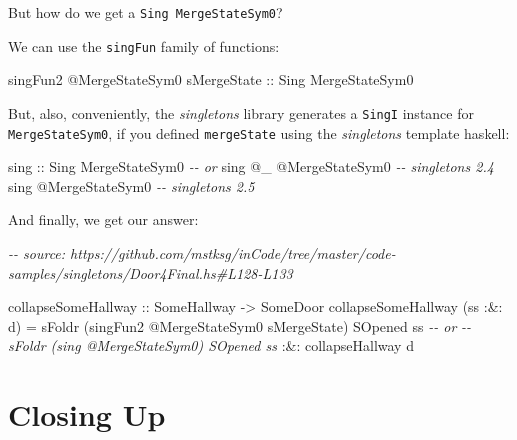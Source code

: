 \documentclass[]{article}
\newenvironment{Shaded}{}{}
\newcommand{\CommentTok}[1]{\textcolor[rgb]{0.38,0.63,0.69}{\textit{#1}}}
\newcommand{\DataTypeTok}[1]{\textcolor[rgb]{0.56,0.13,0.00}{#1}}
\newcommand{\NormalTok}[1]{#1}
\newcommand{\OperatorTok}[1]{\textcolor[rgb]{0.40,0.40,0.40}{#1}}
\newcommand{\OtherTok}[1]{\textcolor[rgb]{0.00,0.44,0.13}{#1}}
\begin{document}
But how do we get a \texttt{Sing\ MergeStateSym0}?

We can use the \texttt{singFun} family of functions:

\begin{Shaded}
\begin{Highlighting}[]
\NormalTok{singFun2 }\OperatorTok{@}\DataTypeTok{MergeStateSym0}\NormalTok{ sMergeState}
\OtherTok{    ::} \DataTypeTok{Sing} \DataTypeTok{MergeStateSym0}
\end{Highlighting}
\end{Shaded}

But, also, conveniently, the \emph{singletons} library generates a
\texttt{SingI} instance for \texttt{MergeStateSym0}, if you defined
\texttt{mergeState} using the \emph{singletons} template haskell:

\begin{Shaded}
\begin{Highlighting}[]
\OtherTok{sing ::} \DataTypeTok{Sing} \DataTypeTok{MergeStateSym0}
\CommentTok{{-}{-} or}
\NormalTok{sing }\OperatorTok{@}\NormalTok{\_ }\OperatorTok{@}\DataTypeTok{MergeStateSym0}         \CommentTok{{-}{-} singletons 2.4}
\NormalTok{sing }\OperatorTok{@}\DataTypeTok{MergeStateSym0}            \CommentTok{{-}{-} singletons 2.5}
\end{Highlighting}
\end{Shaded}

And finally, we get our answer:

\begin{Shaded}
\begin{Highlighting}[]
\CommentTok{{-}{-} source: https://github.com/mstksg/inCode/tree/master/code{-}samples/singletons/Door4Final.hs\#L128{-}L133}

\OtherTok{collapseSomeHallway\textquotesingle{}\textquotesingle{} ::} \DataTypeTok{SomeHallway} \OtherTok{{-}>} \DataTypeTok{SomeDoor}
\NormalTok{collapseSomeHallway\textquotesingle{}\textquotesingle{} (ss }\OperatorTok{:\&:}\NormalTok{ d) }\OtherTok{=}
\NormalTok{        sFoldr (singFun2 }\OperatorTok{@}\DataTypeTok{MergeStateSym0}\NormalTok{ sMergeState) }\DataTypeTok{SOpened}\NormalTok{ ss}
     \CommentTok{{-}{-} or}
     \CommentTok{{-}{-} sFoldr (sing @MergeStateSym0) SOpened ss}
    \OperatorTok{:\&:}\NormalTok{ collapseHallway\textquotesingle{}\textquotesingle{} d}
\end{Highlighting}
\end{Shaded}

\hypertarget{closing-up}{%
\section{Closing Up}\label{closing-up}}
\end{document}
